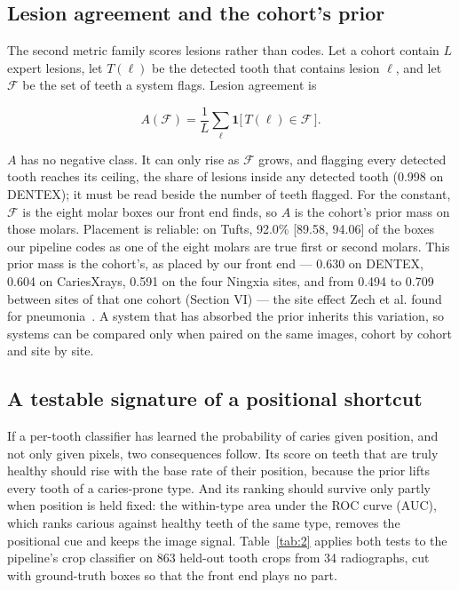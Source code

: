 \documentclass[conference]{IEEEtran}
\begin{document}
\subsection{Lesion agreement and the cohort's prior}

The second metric family scores lesions rather than codes. Let a cohort contain $L$ expert lesions, let $T(\ell)$ be the detected tooth that contains lesion $\ell$, and let $\mathcal{F}$ be the set of teeth a system flags. Lesion agreement is

\begin{equation}
A(\mathcal{F}) = \frac{1}{L} \sum_{\ell} \mathbf{1}\big[\, T(\ell) \in \mathcal{F} \,\big].
\end{equation}

$A$ has no negative class. It can only rise as $\mathcal{F}$ grows, and flagging every detected tooth reaches its ceiling, the share of lesions inside any detected tooth (0.998 on DENTEX); it must be read beside the number of teeth flagged. For the constant, $\mathcal{F}$ is the eight molar boxes our front end finds, so $A$ is the cohort's prior mass on those molars. Placement is reliable: on Tufts, 92.0\% [89.58, 94.06] of the boxes our pipeline codes as one of the eight molars are true first or second molars. This prior mass is the cohort's, as placed by our front end — 0.630 on DENTEX, 0.604 on CariesXrays, 0.591 on the four Ningxia sites, and from 0.494 to 0.709 between sites of that one cohort (Section VI) — the site effect Zech et al. found for pneumonia~\cite{zech2018variable}. A system that has absorbed the prior inherits this variation, so systems can be compared only when paired on the same images, cohort by cohort and site by site.

\subsection{A testable signature of a positional shortcut}

If a per-tooth classifier has learned the probability of caries given position, and not only given pixels, two consequences follow. Its score on teeth that are truly healthy should rise with the base rate of their position, because the prior lifts every tooth of a caries-prone type. And its ranking should survive only partly when position is held fixed: the within-type area under the ROC curve (AUC), which ranks carious against healthy teeth of the same type, removes the positional cue and keeps the image signal. Table~\ref{tab:2} applies both tests to the pipeline's crop classifier on 863 held-out tooth crops from 34 radiographs, cut with ground-truth boxes so that the front end plays no part.
\end{document}
